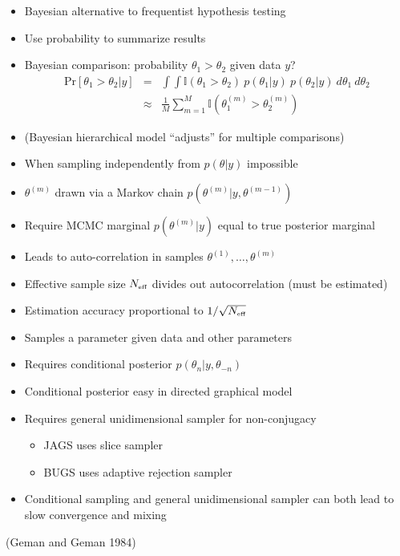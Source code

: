 \documentclass[10pt]{report}
\newcommand{\sld}[1]{\newpage{\noindent\LARGE \ \ \
    \textcolor{MidnightBlue}{\bfseries #1}}\vspace*{4pt}}
\begin{document}
\sld{Monte Carlo Example II}
\begin{itemize}
\item Bayesian alternative to frequentist hypothesis testing
\item Use probability to summarize results
\item Bayesian comparison: probability $\theta_1 > \theta_2$ given
  data $y$?
  \begin{eqnarray*}
    \mbox{Pr}[\theta_1 > \theta_2|y] 
    & = & 
    \int \int 
    \mathbb{I}(\theta_1 > \theta_2) \ p(\theta_1|y) \ p(\theta_2|y)  
    \ d\theta_1 \ d\theta_2
    \\
    & \approx & 
    \frac{1}{M} \sum_{m=1}^M \mathbb{I}(\theta_1^{(m)} > \theta_2^{(m)})
  \end{eqnarray*}
\item (Bayesian hierarchical model ``adjusts'' for multiple comparisons)
\end{itemize}

\sld{Markov Chain Monte Carlo}
\begin{itemize}
\item When sampling independently from $p(\theta|y)$ impossible
\item $\theta^{(m)}$ drawn via a Markov chain $p(\theta^{(m)}|y,\theta^{(m-1)})$
\item Require MCMC marginal $p(\theta^{(m)}|y)$ equal to true
  posterior marginal
\item Leads to auto-correlation in samples
  $\theta^{(1)},\ldots, \theta^{(m)}$
\item Effective sample size $N_{\mbox{\tiny eff}}$ divides out
  autocorrelation (must be estimated)
\item Estimation accuracy proportional to $1 / \sqrt{N_{\mbox{\tiny eff}}}$
\end{itemize}

\sld{Gibbs Sampling}
\begin{itemize}
\item Samples a parameter given data and other parameters
\item Requires conditional posterior $p(\theta_n|y,\theta_{-n})$
\item Conditional posterior easy in directed graphical model
\item Requires general unidimensional sampler for non-conjugacy

  \begin{itemize}
  \item JAGS uses slice sampler
  \item BUGS uses adaptive rejection sampler
  \end{itemize}
\item Conditional sampling and general unidimensional sampler 
  can both lead to slow convergence and mixing
\end{itemize}
\vfill\hfill
{\small (Geman and Geman 1984)}
\end{document}
